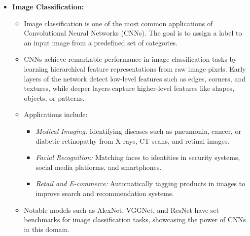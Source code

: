 \begin{itemize}
	\item \textbf{Image Classification:}
	\begin{itemize}
		\item Image classification is one of the most common applications of Convolutional Neural Networks (CNNs). The goal is to assign a label to an input image from a predefined set of categories.
		\item CNNs achieve remarkable performance in image classification tasks by learning hierarchical feature representations from raw image pixels. Early layers of the network detect low-level features such as edges, corners, and textures, while deeper layers capture higher-level features like shapes, objects, or patterns.
		\item Applications include:
		\begin{itemize}
			\item \textit{Medical Imaging:} Identifying diseases such as pneumonia, cancer, or diabetic retinopathy from X-rays, CT scans, and retinal images.
			\item \textit{Facial Recognition:} Matching faces to identities in security systems, social media platforms, and smartphones.
			\item \textit{Retail and E-commerce:} Automatically tagging products in images to improve search and recommendation systems.
		\end{itemize}
		\item Notable models such as AlexNet, VGGNet, and ResNet have set benchmarks for image classification tasks, showcasing the power of CNNs in this domain.
	\end{itemize}
	

\end{itemize}

